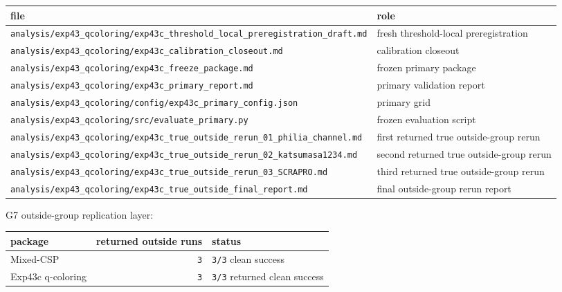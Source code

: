 \documentclass[12pt,a4paper]{article}
\begin{document}
{\def\LTcaptype{table} %
\begin{longtable}[]{@{}
  >{\raggedright\arraybackslash}p{}
  >{\raggedright\arraybackslash}p{}@{}}
\toprule\noalign{}
\begin{minipage}[b]{\linewidth}\raggedright
file
\end{minipage} & \begin{minipage}[b]{\linewidth}\raggedright
role
\end{minipage} \\
\midrule\noalign{}
\endhead
\bottomrule\noalign{}
\endlastfoot
\texttt{analysis/exp43\_qcoloring/exp43c\_threshold\_local\_preregistration\_draft.md} & fresh threshold-local preregistration \\
\texttt{analysis/exp43\_qcoloring/exp43c\_calibration\_closeout.md} & calibration closeout \\
\texttt{analysis/exp43\_qcoloring/exp43c\_freeze\_package.md} & frozen primary package \\
\texttt{analysis/exp43\_qcoloring/exp43c\_primary\_report.md} & primary validation report \\
\texttt{analysis/exp43\_qcoloring/config/exp43c\_primary\_config.json} & primary grid \\
\texttt{analysis/exp43\_qcoloring/src/evaluate\_primary.py} & frozen evaluation script \\
\texttt{analysis/exp43\_qcoloring/exp43c\_true\_outside\_rerun\_01\_philia\_channel.md} & first returned true outside-group rerun \\
\texttt{analysis/exp43\_qcoloring/exp43c\_true\_outside\_rerun\_02\_katsumasa1234.md} & second returned true outside-group rerun \\
\texttt{analysis/exp43\_qcoloring/exp43c\_true\_outside\_rerun\_03\_SCRAPRO.md} & third returned true outside-group rerun \\
\texttt{analysis/exp43\_qcoloring/exp43c\_true\_outside\_final\_report.md} & final outside-group rerun report \\
\end{longtable}
}

G7 outside-group replication layer:

{\def\LTcaptype{table} %
\begin{longtable}[]{@{}lrl@{}}
\toprule\noalign{}
package & returned outside runs & status \\
\midrule\noalign{}
\endhead
\bottomrule\noalign{}
\endlastfoot
Mixed-CSP & \texttt{3} & \texttt{3/3} clean success \\
Exp43c q-coloring & \texttt{3} & \texttt{3/3} returned clean success \\
\end{longtable}
}
\end{document}
